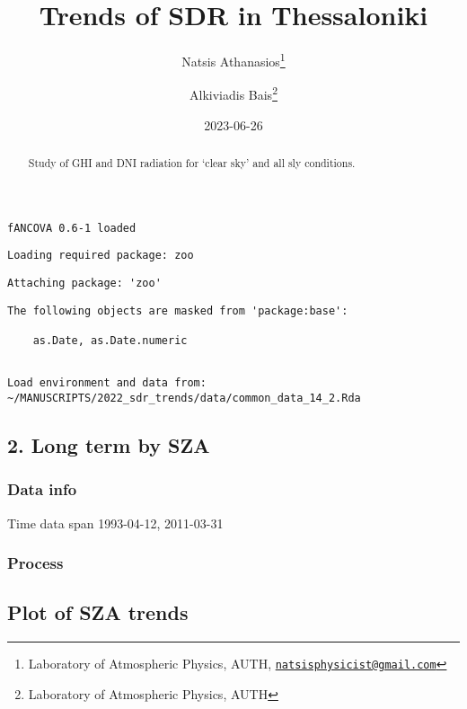 \documentclass[
  10pt,
  a4paper,oneside]{article}
\title{Trends of SDR in Thessaloniki}
\author{Natsis Athanasios\footnote{Laboratory of Atmospheric Physics, AUTH, \href{mailto:natsisphysicist@gmail.com}{\nolinkurl{natsisphysicist@gmail.com}}} \and Alkiviadis Bais\footnote{Laboratory of Atmospheric Physics, AUTH}}
\date{2023-06-26}
\begin{document}
\maketitle
\begin{abstract}
Study of GHI and DNI radiation for `clear sky' and all sly conditions.
\end{abstract}

{
\hypersetup{linkcolor=}
\setcounter{tocdepth}{4}
\tableofcontents
}
\begin{verbatim}
fANCOVA 0.6-1 loaded
\end{verbatim}

\begin{verbatim}
Loading required package: zoo
\end{verbatim}

\begin{verbatim}
Attaching package: 'zoo'
\end{verbatim}

\begin{verbatim}
The following objects are masked from 'package:base':

    as.Date, as.Date.numeric
\end{verbatim}

\begin{verbatim}

Load environment and data from:  ~/MANUSCRIPTS/2022_sdr_trends/data/common_data_14_2.Rda 
\end{verbatim}

\hypertarget{long-term-by-sza}{%
\subsection{2. Long term by SZA}\label{long-term-by-sza}}

\hypertarget{data-info}{%
\subsubsection{Data info}\label{data-info}}

Time data span 1993-04-12, 2011-03-31

\hypertarget{process}{%
\subsubsection{Process}\label{process}}

\FloatBarrier

\hypertarget{plot-of-sza-trends}{%
\subsection{Plot of SZA trends}\label{plot-of-sza-trends}}
\end{document}
